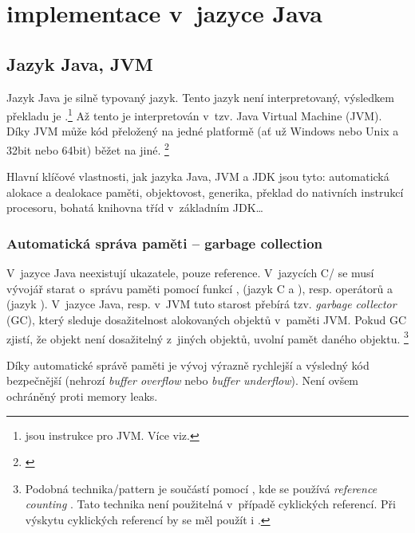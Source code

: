 \chapter{\MIndex{} implementace v~jazyce Java}


\section{Jazyk Java, JVM}

Jazyk Java je silně typovaný jazyk. Tento jazyk není interpretovaný,
výsledkem překladu je \bytecode{}.\footnote{\bytecode{} jsou instrukce pro JVM. Více viz. } Až tento \bytecode{} je interpretován
v~tzv. Java Virtual Machine (JVM).
Díky JVM může kód přeložený na jedné platformě (ať už Windows nebo Unix a 32bit nebo 64bit) běžet na jiné. \footnote{\emph{}\cite{lindholm2013java}}

Hlavní klíčové vlastnosti, jak jazyka Java, JVM a JDK
jsou tyto: automatická alokace a dealokace paměti, objektovost, generika,
překlad \bytecode{} do nativních instrukcí procesoru, bohatá
knihovna tříd v~základním JDK\ldots{}


\subsection{Automatická správa paměti -- garbage collection}

V~jazyce Java neexistují ukazatele, pouze reference. V~jazycích C/\CC{}
se musí vývojář starat o~správu paměti pomocí funkcí ,
 (jazyk C a \CC), resp. operátorů  a 
(jazyk \CC). V~jazyce Java, resp. v~JVM \cite{lindholm2013java} tuto starost přebírá tzv. \emph{garbage
collector} (GC), který sleduje
dosažitelnost alokovaných objektů v~paměti JVM. Pokud GC
zjistí, že objekt není dosažitelný z~jiných objektů, uvolní pamět daného objektu.
\footnote{Podobná technika/pattern je součástí  pomocí ,
kde se používá \emph{reference counting} \cite{ISO:2012:CPP}. Tato technika není použitelná v~případě cyklických referencí. Při výskytu cyklických referencí by se měl použít i .
}

Díky automatické správě paměti je vývoj výrazně rychlejší a výsledný
kód bezpečnější (nehrozí \emph{buffer overflow} nebo \emph{buffer underflow}). Není ovšem ochráněný proti
memory leaks.

